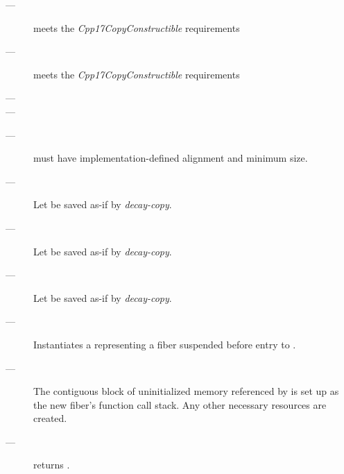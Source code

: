 
\mandates
\begin{description}
    \item[---]  meets the \emph{Cpp17CopyConstructible} requirements
    \item[---]  meets the \emph{Cpp17CopyConstructible} requirements
    \item[---] 
    \item[---] 
\end{description}

\precond
\begin{description}
    \item[---]  must have implementation-defined alignment and minimum size.
\end{description}

\effects
\begin{description}
    \item[---] Let  be saved as-if by \emph{decay-copy}.
    \item[---] Let  be saved as-if by \emph{decay-copy}.
    \item[---] Let  be saved as-if by \emph{decay-copy}.
    \item[---] Instantiates a \fiber representing a fiber suspended before
              entry to .
    \item[---] The contiguous block of uninitialized memory referenced
              by  is set up as the new fiber's function call stack.
              Any other necessary resources are created.
\end{description}

\postcond
\begin{description}
    \item[---]  returns .
\end{description}

